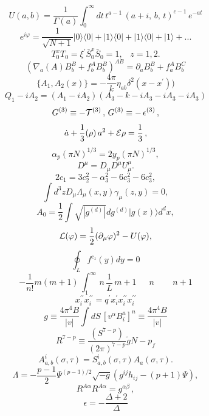 \documentclass{article}
\begin{document}
$$U ( a , b ) = \frac { 1 } { \Gamma ( a ) } \int _ { 0 } ^ { \infty } d t \, t ^ { a - 1 } \, ( a + i , \, b , \, t ) ^ { c - 1 } \, e ^ { - a t }$$
$$e ^ { i \varphi } = \frac { 1 } { \sqrt { N + 1 } } | 0 \rangle \langle 0 | + | 1 \rangle \langle 0 | + | 1 \rangle \langle 0 | + | 1 \rangle + . . .$$
$$T _ { 0 } ^ { x } T _ { 0 } = \xi ^ { \prime } \bar { S } _ { 0 } ^ { x } \bar { S } _ { 0 } = 1 , \; \; \; z = 1 , 2 .$$
$$( \nabla _ { a } ( A ) B _ { b } ^ { B } + f _ { b } ^ { A } B _ { b } ^ { B } ) ^ { A B } = \partial _ { a } B _ { b } ^ { B } + f _ { a } ^ { A } B _ { b } ^ { C }$$
$$\{ A _ { 1 } , A _ { 2 } ( x ) \} = - \frac { 4 \pi } { k } \eta _ { a b } \delta ^ { 2 } ( x - x ^ { \prime } ) \Big )$$
$$Q _ { 1 } - i A _ { 2 } = ( A _ { 1 } - i A _ { 2 } ) ( A _ { 3 } - k - i A _ { 3 } - i A _ { 3 } - i A _ { 3 } )$$
$$G ^ { ( 3 ) } \equiv - { \cal T } ^ { ( 3 ) } \, , \, G ^ { ( 3 ) } \equiv - \, \epsilon ^ { ( 3 ) } \, ,$$
$$\dot { a } + \frac { 1 } { 3 } ( \rho ) \, a ^ { 2 } + { \cal E } \rho = { \frac { 1 } { 3 } } \, ,$$
$$\alpha _ { p } ( \pi N ) ^ { 1 / 3 } = 2 y _ { p } ( \pi N ) ^ { 1 / 3 } ,$$
$$D ^ { \mu } = D _ { \mu } D ^ { \mu } U _ { \mu } ^ { \mu } .$$
$$2 c _ { 1 } = 3 c _ { 2 } ^ { 2 } - \alpha _ { 3 } ^ { 2 } - 6 c _ { 3 } ^ { 2 } - 6 c _ { 3 } ^ { 2 } ,$$
$$\int d ^ { 3 } z D _ { \mu } \Lambda _ { \mu } ( x , y ) \gamma _ { \mu } ( z , y ) = 0 ,$$
$$A _ { 0 } = \frac { 1 } { 2 } \int \sqrt { | g ^ { ( d ) } | } d g ^ { ( d ) } | g ( x ) \rangle d ^ { d } x ,$$
$${ \cal L } ( \varphi ) = \frac { 1 } { 2 } ( \partial _ { \mu } \varphi ) ^ { 2 } - U ( \varphi ) ,$$
$$\oint _ { L } f ^ { c _ { 1 } } ( y ) d y = 0$$
$$- \frac { 1 } { n ! } m ( m + 1 ) \, \int _ { 1 } ^ { \infty } \, n \, \frac { 1 } { L } \, m + 1 \, \, \, \, \, \, \, \, \, n \, \, \, \, \, \, \, \, \, \, \, \, \, n + 1$$
$$x _ { i } ^ { \prime \prime } x _ { i } ^ { \prime \prime } = q ^ { \prime } x _ { i } ^ { \prime } x _ { i } ^ { \prime \prime } x _ { i } ^ { \prime \prime }$$
$$g \equiv \frac { 4 \pi ^ { 4 } B } { | v | } \int d S \, \left [ v ^ { \alpha } B _ { i } ^ { a } \right ] ^ { n } \equiv \frac { 4 \pi ^ { 4 } B } { | v | }$$
$$R ^ { 7 - p } \equiv \frac { ( S ^ { 7 - p } ) } { ( 2 \pi ) ^ { 7 - p } } \tilde { g } N - p _ { f }$$
$$A _ { a , b } ^ { i } ( \sigma , \tau ) = S _ { a , b } ^ { i } ( \sigma , \tau ) A _ { a } ( \sigma , \tau ) .$$
$$\Lambda = - \frac { p - 1 } { 2 } \Psi ^ { ( p - 3 ) / 2 } \sqrt { - g } \left ( g ^ { i j } h _ { i j } - ( p + 1 ) \Psi \right ) ,$$
$$R ^ { A \alpha } R ^ { A \alpha } = g ^ { \alpha \beta } \, ,$$
$$\epsilon = - \frac { \Delta + 2 } { \Delta }$$
\end{document}
